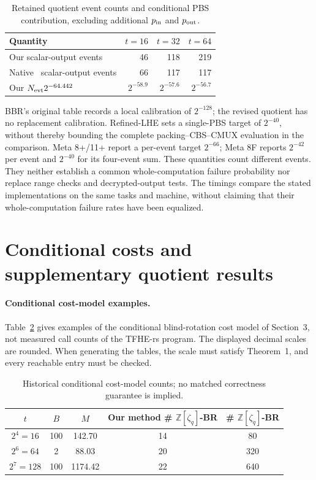 \documentclass[11pt,a4paper]{article}
\newcommand{\Z}{\mathbb{Z}}
\begin{document}
\begin{table}[H]
\centering\small
\caption{Retained quotient event counts and conditional PBS contribution, excluding additional $p_{\rm in}$ and $p_{\rm out}$.}
\label{tab:failure-model}
\begin{tabular}{lrrr}
\toprule
Quantity & $t=16$ & $t=32$ & $t=64$\\
\midrule
Our scalar-output events & 46 & 118 & 219\\
Native~\cite{TFHERs087} scalar-output events & 66 & 117 & 117\\
Our $N_{\rm evt}2^{-64.442}$ & $2^{-58.9}$ & $2^{-57.6}$ & $2^{-56.7}$\\
\bottomrule
\end{tabular}
\end{table}

BBR's original table records a local calibration of $2^{-128}$; the revised quotient has no replacement calibration. Refined-LHE sets a single-PBS target of $2^{-40}$, without thereby bounding the complete packing--CBS--CMUX evaluation in the comparison. Meta 8+/11+ report a per-event target $2^{-66}$; Meta 8F reports $2^{-42}$ per event and $2^{-40}$ for its four-event sum. These quantities count different events. They neither establish a common whole-computation failure probability nor replace range checks and decrypted-output tests. The timings compare the stated implementations on the same tasks and machine, without claiming that their whole-computation failure rates have been equalized.


\FloatBarrier
\section{Conditional costs and supplementary quotient results}
\paragraph{Conditional cost-model examples.} 


Table~\ref{tab:practical-div} gives examples of the conditional blind-rotation cost model of Section~3, not measured call counts of the TFHE-rs program. The displayed decimal scales are rounded. When generating the tables, the scale must satisfy Theorem~1, and every reachable entry must be checked.

 

\begin{table}[H] 
	\centering
	\caption{Historical conditional cost-model counts; no matched correctness guarantee is implied.} 
	\label{tab:practical-div} 
	\begin{tabular}{ccccc} 
		\toprule
		$t$ & $B$ & $M$ & Our method \# $\Z[\zeta_q]$-BR & \cite{OKC21} \# $\Z[\zeta_q]$-BR \\ 
		\midrule
		$2^4=16$ & 100 & 142.70 & 14 & 80 \\ 
		$2^6=64$ & 2 & 88.03 & 20 & 320 \\ 
		$2^7=128$ & 100 & 1174.42 & 22 & 640 \\ 
		\bottomrule
	\end{tabular} 
\end{table}
\end{document}
